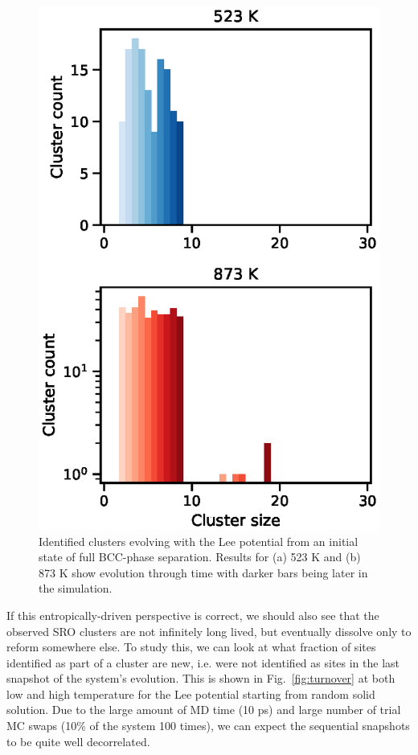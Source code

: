 \begin{figure}[h]
    \centering
    \includegraphics[width=\textwidth,height=0.75\textheight,keepaspectratio]{figures/decomposing_clusters}
    \caption{Identified \DOTHREE clusters evolving with the Lee potential from an initial state of full BCC-\DOTHREE phase separation. Results for (a) 523 K and (b) 873 K show evolution through time with darker bars being later in the simulation.}
    \label{fig:lee_dissolution}
\end{figure}

If this entropically-driven perspective is correct, we should also see that the observed SRO clusters are not infinitely long lived, but eventually dissolve only to reform somewhere else.
To study this, we can look at what fraction of sites identified as part of a \DOTHREE cluster are new, i.e. were not identified as \DOTHREE sites in the last snapshot of the system's evolution.
This is shown in Fig.~\ref{fig:turnover} at both low and high temperature for the Lee potential starting from random solid solution.
Due to the large amount of MD time (10 ps) and large number of trial MC swaps (10\% of the system 100 times), we can expect the sequential snapshots to be quite well decorrelated.

